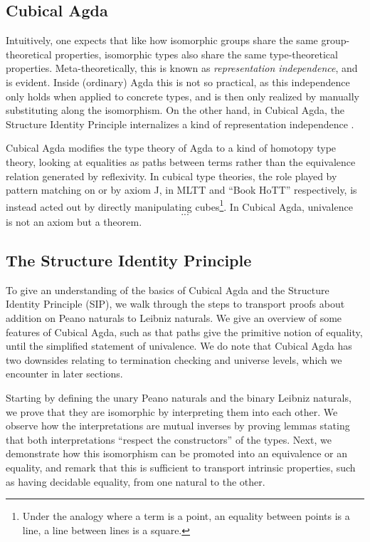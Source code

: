 \subsection{Cubical Agda}
Intuitively, one expects that like how isomorphic groups share the same group-theoretical properties, isomorphic types also share the same type-theoretical properties. Meta-theoretically, this is known as \emph{representation independence}, and is evident. Inside (ordinary) Agda this is not so practical, as this independence only holds when applied to concrete types, and is then only realized by manually substituting along the isomorphism. On the other hand, in Cubical Agda, the Structure Identity Principle internalizes a kind of representation independence \cite{iri}.

Cubical Agda modifies the type theory of Agda to a kind of homotopy type theory, looking at equalities as paths between terms rather than the equivalence relation generated by reflexivity. In cubical type theories, the role played by pattern matching on  or by axiom J, in MLTT and ``Book HoTT'' respectively, is instead acted out by directly manipulating cubes\footnote{Under the analogy where a term is a point, an equality between points is a line, a line between lines is a square.}. In Cubical Agda, univalence
\[ ... \]
is not an axiom but a theorem.



\subsection{The Structure Identity Principle}\label{sec:leibniz}
To give an understanding of the basics of Cubical Agda \cite{cuagda} and the Structure Identity Principle (SIP), we walk through the steps to transport proofs about addition on Peano naturals to Leibniz naturals. We give an overview of some features of Cubical Agda, such as that paths give the primitive notion of equality, until the simplified statement of univalence. We do note that Cubical Agda has two downsides relating to termination checking and universe levels, which we encounter in later sections.

Starting by defining the unary Peano naturals and the binary Leibniz naturals, we prove that they are isomorphic by interpreting them into each other. We observe how the interpretations are mutual inverses by proving lemmas stating that both interpretations ``respect the constructors'' of the types. Next, we demonstrate how this isomorphism can be promoted into an equivalence or an equality, and remark that this is sufficient to transport intrinsic properties, such as having decidable equality, from one natural to the other.

